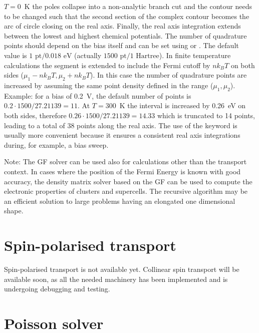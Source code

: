 $T=0$~K the poles collapse into a non-analytic branch cut and the contour needs
to be changed such that the second section of the complex contour becomes the
arc of circle closing on the real axis.  Finally, the real axis integration
extends between the lowest and highest chemical potentials. The number of
quadrature points should depend on the bias itself and can be set using
 or . The default value is $1\text{~pt} /
0.018\text{~eV}$ (actually $1500\text{~pt} / 1\text{~Hartree}$). In finite
temperature calculations the segment is extended to include the Fermi cutoff by
$n k_B T$ on both sides ($\mu_1 - n k_B T, \mu_2 + n k_B T$). In this case the
number of quadrature points are increased by assuming the same point density
defined in the range ($\mu_1, \mu_2$).  Example: for a bias of 0.2~V, the
default number of points is $0.2 \cdot 1500 / 27.21139 = 11$. At $T=300$~K the
interval is increased by 0.26~eV on both sides, therefore $0.26 \cdot 1500 /
27.21139 = 14.33$ which is truncated to 14 points, leading to a total of 38
points along the real axis. The use of the keyword  is usually
more convenient because it ensures a consistent real axis integrations during,
for example, a bias sweep.

Note: The GF solver can be used also for calculations other than the transport
context. In cases where the position of the Fermi Energy is known with good
accuracy, the density matrix solver based on the GF can be used to compute the
electronic properties of clusters and supercells. The recursive algorithm may be
an efficient solution to large problems having an elongated one dimensional
shape.

\section{Spin-polarised transport}

Spin-polarised transport is not available yet. Collinear spin transport will be
available soon, as all the needed machinery has been implemented and is
undergoing debugging and testing.


\section{Poisson solver}

